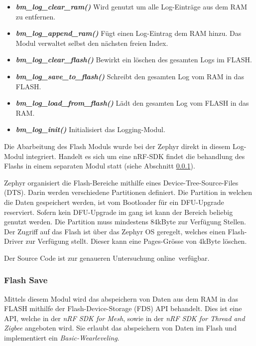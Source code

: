 \begin{itemize}
	\item \textit{\textbf{bm\_log\_clear\_ram()}} Wird genutzt um alle Log-Einträge aus dem RAM zu entfernen.
	\item \textit{\textbf{bm\_log\_append\_ram()}} Fügt einen Log-Eintrag dem RAM hinzu. Das Modul verwaltet selbst den nächsten freien Index. 
	\item \textit{\textbf{bm\_log\_clear\_flash()}} Bewirkt ein löschen des gesamten Logs im FLASH. 
	\item \textit{\textbf{bm\_log\_save\_to\_flash()}} Schreibt den gesamten Log vom RAM in das FLASH. 
	\item \textit{\textbf{bm\_log\_load\_from\_flash()}} Lädt den gesamten Log vom FLASH in das RAM. 
	\item \textit{\textbf{bm\_log\_init()}} Initialisiert das Logging-Modul.
\end{itemize} 

Die Abarbeitung des Flash Moduls wurde bei der Zephyr direkt in diesem Log-Modul integriert. Handelt es sich um eine nRF-SDK findet die behandlung des Flashs in einem separaten Modul statt (siehe Abschnitt \ref{subsubsec:FlashSave}).

Zephyr organisiert die Flash-Bereiche mithilfe eines Device-Tree-Source-Files (DTS). Darin werden verschiedene Partitionen definiert. Die Partition in welchen die Daten gespeichert werden, ist vom Bootloader für ein DFU-Upgrade reserviert. Sofern kein DFU-Upgrade im gang ist kann der Bereich beliebig genutzt werden. Die Partition muss mindestens 84kByte zur Verfügung Stellen. Der Zugriff auf das Flash ist über das Zephyr OS geregelt, welches einen Flash-Driver zur Verfügung stellt. Dieser kann eine Pages-Grösse von 4kByte löschen. 

Der Source Code ist zur genaueren Untersuchung online\footnotemark\ verfügbar. 


\subsubsection{Flash Save}\label{subsubsec:FlashSave}

Mittels diesem Modul wird das abspeichern von Daten aus dem RAM in das FLASH mithilfe der Flash-Device-Storage (FDS) API behandelt. Dies ist eine API, welche in der \textit{nRF SDK for Mesh}, sowie in der \textit{nRF SDK for Thread and Zigbee} angeboten wird. Sie erlaubt das abspeichern von Daten im Flash und implementiert ein \textit{Basic-Wearleveling}. \\

